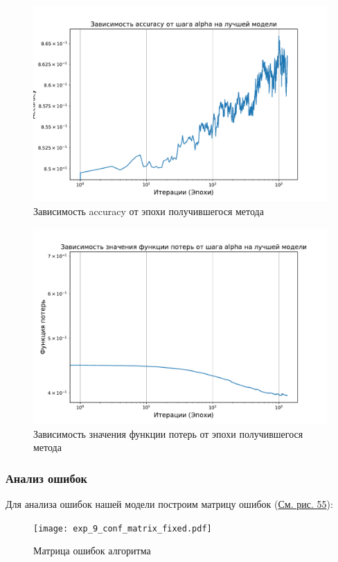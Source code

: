 \documentclass[14pt]{extarticle}
\begin{document}
\begin{figure}[H]
    \centering
    \includegraphics[width=0.85\linewidth]
    {exp_9_acc.pdf}
    \caption{Зависимость accuracy от эпохи получившегося метода}
    \label{fig:exp_9_acc}
\end{figure}

\begin{figure}[H]
    \centering
    \includegraphics[width=0.85\linewidth]
    {exp_9_loss.pdf}
    \caption{Зависимость значения функции потерь от эпохи получившегося метода}
    \label{fig:exp_9_loss}
\end{figure}

\subsubsection{Анализ ошибок}

Для анализа ошибок нашей модели построим матрицу ошибок (\hyperref[fig:exp_9_conf_matrix]{См. рис. 55}):

\begin{figure}[H]
    \centering
    \texttt{[image: exp\_9\_conf\_matrix\_fixed.pdf]}
    \caption{Матрица ошибок алгоритма}
    \label{fig:exp_9_conf_matrix}
\end{figure}
\end{document}
